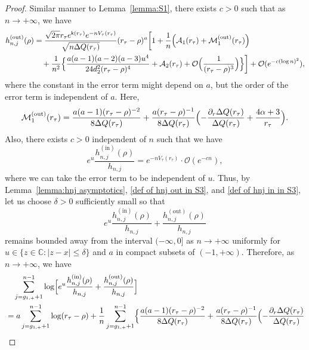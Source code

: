 \documentclass[10pt,a4paper]{amsart}
\newcommand{\C}{\mathds{C}}
\begin{document}
\begin{proof}
Similar manner to Lemma~\ref{lemma:S1}, there exists $c>0$ such that as $n\to+\infty$, we have  
\begin{align}
\begin{split}
\label{def of hnj out in S3}
h_{n,j}^{(\mathrm{out})}(\rho)
&=  
\frac{\sqrt{2\pi}r_{\tau}e^{\mathsf{k}(r_{\tau})}e^{-nV_{\tau}(r_{\tau})}}{\sqrt{n\Delta Q(r_{\tau})}}
(r_{\tau}-\rho)^a
\bigg[
1+\frac{1}{n}
\Bigl(
\mathcal{A}_1(r_{\tau})
+\mathcal{M}_1^{(\mathrm{out})}(r_{\tau})
\Bigr)
\\
&\quad
+\frac{1}{n^2}
\Bigl\{
\frac{a(a-1)(a-2)(a-3)u^4}{24d_2^2(r_{\tau}-\rho)^4}
+\mathcal{A}_2(r_{\tau})
+\mathcal{O}\Bigl(\frac{1}{(r_{\tau}-\rho)^3}\Bigr)
\Bigr\}
\bigg]
+
\mathcal{O}(e^{-c(\log n)^2}),
\end{split}
\end{align}
where the constant in the error term might depend on $a$, but the order of the error term is independent of $a$. Here, 
\[
\mathcal{M}_1^{(\mathrm{out})}(r_{\tau})
=
\frac{a(a-1)(r_{\tau}-\rho)^{-2}}{8\Delta Q(r_{\tau})}
+\frac{a(r_{\tau}-\rho)^{-1}}{8\Delta Q(r_{\tau})}
\Bigl(-\frac{\partial_r\Delta Q(r_{\tau})}{\Delta Q(r_{\tau})}
+\frac{4\alpha+3}{r_{\tau}}
\Bigr). 
\]
Also, there exists $c>0$ independent of $n$ such that we have 
\begin{equation}
\label{def of hnj in in S3}    
e^{u}\frac{h_{n,j}^{(\mathrm{in})}(\rho)}{h_{n,j}}=e^{-nV_{\tau}(r_{\tau})}\cdot\mathcal{O}(e^{-cn}), 
\end{equation}
where we can take the error term to be independent of $u$.
Thus, by Lemma~\ref{lemma:hnj asymptotics}, \eqref{def of hnj out in S3}, and \eqref{def of hnj in in S3}, let us choose $\delta>0$ sufficiently small so that 
\[
e^{u}\frac{h_{n,j}^{(\mathrm{in})}(\rho)}{h_{n,j}}+\frac{h_{n,j}^{(\mathrm{out})}(\rho)}{h_{n,j}}
\]
remains bounded away from the interval $(-\infty,0]$ as $n\to+\infty$ uniformly for $u\in\{z\in\C:|z-x|\leq \delta\}$ and $a$ in compact subsets of $(-1,+\infty)$. 
Therefore, as $n\to+\infty$, we have 
\begin{align*}
&\quad\sum_{j=g_{1,+}+1}^{n-1}\log\Bigl[
e^{u}\frac{h_{n,j}^{(\mathrm{in})}(\rho)}{h_{n,j}}+\frac{h_{n,j}^{(\mathrm{out})}(\rho)}{h_{n,j}}
 \Bigr]   
 \\
&= 
a\sum_{j=g_{1,+}+1}^{n-1}\log(r_{\tau}-\rho)
+
\frac{1}{n}
\sum_{j=g_{1,+}+1}^{n-1}
\Bigl\{ 
\frac{a(a-1)(r_{\tau}-\rho)^{-2}}{8\Delta Q(r_{\tau})}
+\frac{a(r_{\tau}-\rho)^{-1}}{8\Delta Q(r_{\tau})}
\Bigl(-\frac{\partial_r\Delta Q(r_{\tau})}{\Delta Q(r_{\tau})}

\end{align*}
\end{proof}
\end{document}
